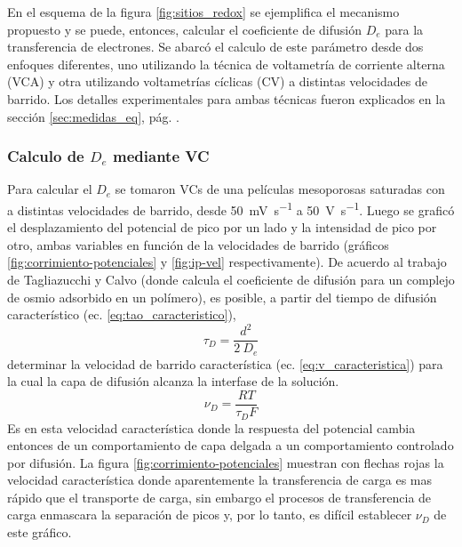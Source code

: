	 En el esquema de la figura \ref{fig:sitios_redox} se ejemplifica el mecanismo propuesto y se puede, entonces, calcular el coeficiente de difusión $D_e$ para la transferencia de electrones. Se abarcó el calculo de este parámetro desde dos enfoques diferentes, uno utilizando la técnica de voltametría de corriente alterna (VCA) y otra utilizando voltametrías cíclicas (CV) a distintas velocidades de barrido. Los detalles experimentales para ambas técnicas fueron explicados en la sección \ref{sec:medidas_eq}, pág. \pageref{sec:medidas_eq}.
	  
	 \subsubsection*{Calculo de $D_e$ mediante VC}	
	 
	   	 Para calcular el $D_e$ se tomaron VCs de una películas mesoporosas saturadas con \ru\space a distintas velocidades de barrido, desde \SI{50}{\milli\volt\per\second} a \SI{50}{\volt\per\second}. Luego se graficó el desplazamiento del potencial de pico por un lado y la intensidad de pico por otro, ambas variables en función de la velocidades de barrido (gráficos \ref{fig:corrimiento-potenciales} y \ref{fig:ip-vel} respectivamente). De acuerdo al trabajo de Tagliazucchi y Calvo\cite{Tagliazucchi2010a} (donde calcula el coeficiente de difusión para un complejo de osmio adsorbido en un polímero), es posible, a partir del tiempo de difusión característico (ec. \ref{eq:tao_caracteristico}),\hfill
	   		\begin{equation}
					\tau_{\scriptscriptstyle{D}}=\frac{d^2}{2\ D_e}
					\label{eq:tao_caracteristico}
			 \end{equation}
	   	 determinar la velocidad de barrido característica (ec. \ref{eq:v_caracteristica}) para la cual la capa de difusión alcanza la interfase de la solución.  
 		   	 \begin{equation}
					\nu_{\scriptscriptstyle{D}}=\frac{RT}{\tau_{\scriptscriptstyle{D}}F}
					\label{eq:v_caracteristica}
			 \end{equation}
		 Es en esta velocidad característica donde la respuesta del potencial cambia entonces de un comportamiento de capa delgada a un comportamiento controlado por difusión. La figura \ref{fig:corrimiento-potenciales} muestran con flechas rojas la velocidad característica donde aparentemente la transferencia de carga es mas rápido que el transporte de carga, sin embargo el procesos de transferencia de carga enmascara la separación de picos y, por lo tanto, es difícil establecer $\nu_{\scriptscriptstyle{D}}$ de este gráfico.
